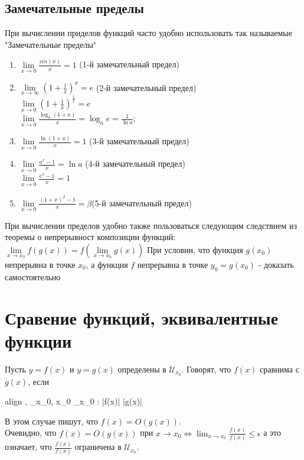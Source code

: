 \documentclass[oneside]{book}
\newcommand{\boxedeq}[2]{\begin{empheq}[box={\fboxsep=6pt\fbox}]{align}\label{#1}#2\end{empheq}}
\begin{document}
\begin{enumerate}
\section{Замечательные пределы}
При вычислении приделов функций часто удобно использовать так называемые "Замечательные пределы"
\begin {enumerate}
\item $\lim\limits_{x\rightarrow 0}\frac{sin(x)}{x}=1$ (1-й замечательный предел)
\item $\lim\limits_{x\rightarrow \infty}(1+\frac{1}{x})^x=e$ (2-й замечательный предел)\\
$\lim\limits_{x\rightarrow 0}(1+\frac{1}{x})^{\frac{1}{x}}=e$
\\$\lim\limits_{x\rightarrow 0}\frac{\log_a(1+x)}{x}=\log_ae=\frac{1}{\ln a}$;
\item $\lim\limits_{x\rightarrow 0}\frac{\ln(1+x)}{x}=1$ (3-й замечательный предел)
\item $\lim\limits_{x\rightarrow 0}\frac{a^x-1}{x}=\ln a$ (4-й замечательный предел)\\
$\lim\limits_{x\rightarrow 0}\frac{e^x-1}{x}=1$
\item $\lim\limits_{x\rightarrow 0}\frac{(1+x)^\beta-1}{x}=\beta$(5-й замечательный предел)
\end{enumerate}
При вычислении пределов удобно также пользоваться следующим следствием из теоремы о непрерывност композиции функций:\\
$\lim \limits_{x\rightarrow x_0}f(g(x))=f(\lim \limits_{x\rightarrow x_0}g(x))$
При условии, что функция $g(x_0)$ непрерывна в точке $x_0$, а функция $f$ непрерывна в точке $y_0 = g(x_0)$ - доказать самостоятельно


    \chapter[Сравнение функций]{Сравение функций, эквивалентные функции\\}
    Пусть $y = f(x)$ и $y = g(x)$ определены в $_{x_0}$. Говорят, что $f(x)$ сравнима с $g(x)$, если
    \boxedeq{eq:*}{
        \exists \epsilon, \exists \mathcal{U}_{x_0}, \forall x_0 \in \mathcal{U}_{x_0} : |f(x)| \leq \epsilon |g(x)|
    }
    В этом случае пишут, что $f(x) = O(g(x))$. \\
    Очевидно, что $f(x) = O(g(x))$ при $x \rightarrow x_0 \Leftrightarrow \lim_{x \rightarrow x_0}{\frac{f(x)}{f(x)}} \leq \epsilon$
    а это означает, что $\frac{f(x)}{f(x)}$ ограничена в $\mathcal{U}_{x_0}$.


\end{enumerate}
\end{document}
